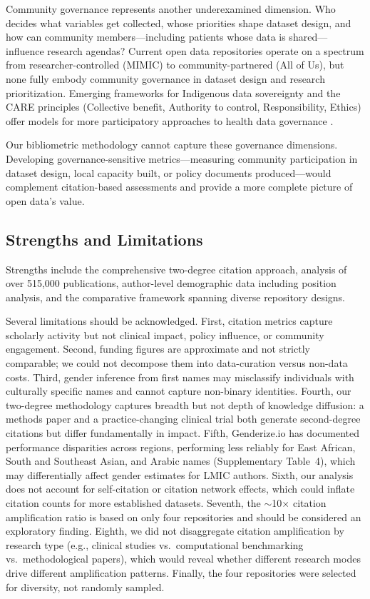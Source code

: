 \documentclass[11pt]{article}
\begin{document}
Community governance represents another underexamined dimension. Who decides what variables get collected, whose priorities shape dataset design, and how can community members---including patients whose data is shared---influence research agendas? Current open data repositories operate on a spectrum from researcher-controlled (MIMIC) to community-partnered (All of Us), but none fully embody community governance in dataset design and research prioritization. Emerging frameworks for Indigenous data sovereignty and the CARE principles (Collective benefit, Authority to control, Responsibility, Ethics) offer models for more participatory approaches to health data governance \cite{hudson2023indigenous}.

Our bibliometric methodology cannot capture these governance dimensions. Developing governance-sensitive metrics---measuring community participation in dataset design, local capacity built, or policy documents produced---would complement citation-based assessments and provide a more complete picture of open data's value.

\subsection{Strengths and Limitations}

Strengths include the comprehensive two-degree citation approach, analysis of over 515,000 publications, author-level demographic data including position analysis, and the comparative framework spanning diverse repository designs.

Several limitations should be acknowledged.
First, citation metrics capture scholarly activity but not clinical impact, policy influence, or community engagement.
Second, funding figures are approximate and not strictly comparable; we could not decompose them into data-curation versus non-data costs.
Third, gender inference from first names may misclassify individuals with culturally specific names and cannot capture non-binary identities.
Fourth, our two-degree methodology captures breadth but not depth of knowledge diffusion: a methods paper and a practice-changing clinical trial both generate second-degree citations but differ fundamentally in impact.
Fifth, Genderize.io has documented performance disparities across regions, performing less reliably for East African, South and Southeast Asian, and Arabic names (Supplementary Table~4), which may differentially affect gender estimates for LMIC authors.
Sixth, our analysis does not account for self-citation or citation network effects, which could inflate citation counts for more established datasets.
Seventh, the ${\sim}$10$\times$ citation amplification ratio is based on only four repositories and should be considered an exploratory finding.
Eighth, we did not disaggregate citation amplification by research type (e.g., clinical studies vs.\ computational benchmarking vs.\ methodological papers), which would reveal whether different research modes drive different amplification patterns.
Finally, the four repositories were selected for diversity, not randomly sampled.
\end{document}
